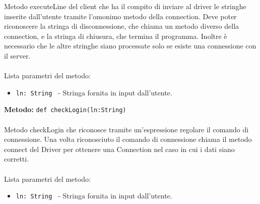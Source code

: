 \documentclass[a4paper]{article}
\begin{document}
			Metodo executeLine del client che ha il compito di inviare al driver le stringhe inserite dall'utente tramite l'omonimo metodo della connection. Deve poter riconoscere la stringa di disconnessione, che chiama un metodo diverso della connection, e la stringa di chiusura, che termina il programma. Inoltre è necessario che le altre stringhe siano processate solo se esiste una connessione con il server.
			\\ \\
			Lista parametri del metodo:
			\begin{itemize}
				\item \texttt{ln: String } - Stringa fornita in input dall'utente.
			\end{itemize}
			\textbf{Metodo: }\texttt{def checkLogin(ln:String)}
			\\ \\
			Metodo checkLogin che riconosce tramite un'espressione regolare il comando di connessione. Una volta riconosciuto il comando di connessione chiama il metodo connect del Driver per ottenere una Connection nel caso in cui i dati siano corretti.
			\\ \\
			Lista parametri del metodo:
			\begin{itemize}
				\item \texttt{ln: String } - Stringa fornita in input dall'utente.
			\end{itemize}
			
\end{document}
